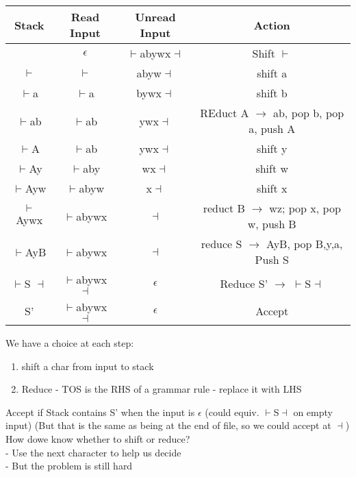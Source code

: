 \documentclass[12pt]{article}
\begin{document}
	\begin{tabular}{c  c  c  c}
		Stack & Read Input & Unread Input & Action \\ \hline
		& $\epsilon$ & $\vdash$abywx$\dashv$ & Shift $\vdash$\\
		$\vdash$ & $\vdash$ & abyw$\dashv$ & shift a\\
		$\vdash$a & $\vdash$a & bywx$\dashv$ & shift b\\
		$\vdash$ab & $\vdash$ab & ywx$\dashv$ & REduct A $\rightarrow$ ab, pop b, pop a, push A\\
		$\vdash$A & $\vdash$ab & ywx$\dashv$ & shift y\\
		$\vdash$Ay & $\vdash$aby & wx$\dashv$ & shift w\\
		$\vdash$Ayw & $\vdash$abyw & x$\dashv$ & shift x\\
		$\vdash$Aywx & $\vdash$abywx & $\dashv$ & reduct B $\rightarrow$ wz; pop x, pop w, push B\\
		$\vdash$AyB & $\vdash$abywx & $\dashv$ & reduce S $\rightarrow$ AyB, pop B,y,a, Push S\\
		$\vdash$S $\dashv$ & $\vdash$abywx$\dashv$ & $\epsilon$ & Reduce S' $\rightarrow$ $\vdash$S$\dashv$\\
		S' & $\vdash$abywx$\dashv$ & $\epsilon$ & Accept\\	
	\end{tabular}
	
	We have a choice at each step:\\
	\begin{enumerate}
		\item shift a char from input to stack
		\item Reduce - TOS is the RHS of a grammar rule - replace it with LHS
	\end{enumerate}
	Accept if Stack contains S' when the input is $\epsilon$ (could equiv. $\vdash$S$\dashv$ on empty input) (But that is the same as being at the end of file, so we could accept at $\dashv$)\\
	
	How dowe know whether to shift or reduce?\\
	- Use the next character to help us decide\\
	- But the problem is still hard\\
	
\end{document}
